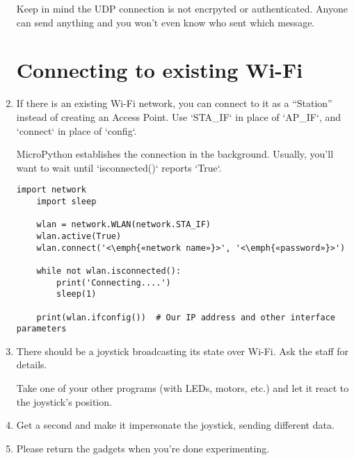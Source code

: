 \documentclass{../tutorial}
\begin{document}
\begin{enumerate}
    Keep in mind the UDP connection is not encrpyted or authenticated.
    Anyone can send anything and you won't even know who sent which message.

\section{Connecting to existing Wi-Fi}

\item
    If there is an existing Wi-Fi network, you can connect to it as a “Station”
    instead of creating an Access Point.
    Use `STA_IF` in place of `AP_IF`, and `connect` in place of `config`.

    MicroPython establishes the connection in the background.
    Usually, you'll want to wait until `isconnected()` reports `True`.

    \begin{lstlisting}[escapeinside=<>]
    import network
    import sleep

    wlan = network.WLAN(network.STA_IF)
    wlan.active(True)
    wlan.connect('<\emph{«network name»}>', '<\emph{«password»}>')

    while not wlan.isconnected():
        print('Connecting....')
        sleep(1)

    print(wlan.ifconfig())  # Our IP address and other interface parameters
    \end{lstlisting}

\item
    There should be a joystick broadcasting its state over Wi-Fi.
    Ask the staff for details.

    Take one of your other programs (with LEDs, motors, etc.)
    and let it react to the joystick's position.

\item
    Get a second  and make it impersonate the joystick,
    sending different data.

\item
    Please return the gadgets when you're done experimenting.

\end{enumerate}
\end{document}
